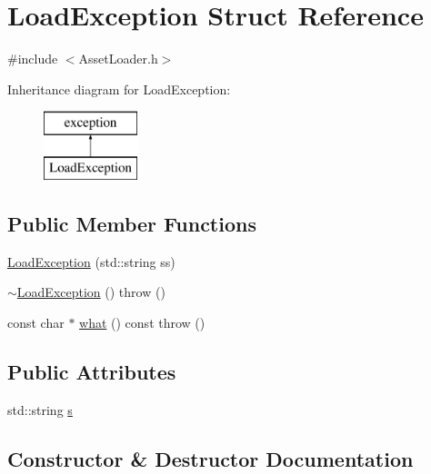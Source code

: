 \hypertarget{struct_load_exception}{}\section{Load\+Exception Struct Reference}
\label{struct_load_exception}


{\ttfamily \#include $<$Asset\+Loader.\+h$>$}

Inheritance diagram for Load\+Exception\+:\begin{figure}[H]
\begin{center}
\leavevmode
\includegraphics[height=2.000000cm]{struct_load_exception}
\end{center}
\end{figure}
\subsection*{Public Member Functions}
\begin{DoxyCompactItemize}
\item 
\hyperlink{struct_load_exception_a0dfeb76ded37d02c7765826842934f86}{Load\+Exception} (std\+::string ss)
\item 
\hyperlink{struct_load_exception_afb006cdbeb6ca9bab0c9bc3f7df9291b}{$\sim$\+Load\+Exception} ()  throw ()
\item 
const char $\ast$ \hyperlink{struct_load_exception_aa77af17720977ac8f651a4678ecf672c}{what} () const  throw ()
\end{DoxyCompactItemize}
\subsection*{Public Attributes}
\begin{DoxyCompactItemize}
\item 
std\+::string \hyperlink{struct_load_exception_ac148fff547e53eac53f36a2eb18f312a}{s}
\end{DoxyCompactItemize}


\subsection{Constructor \& Destructor Documentation}
\hypertarget{struct_load_exception_a0dfeb76ded37d02c7765826842934f86}{}\label{struct_load_exception_a0dfeb76ded37d02c7765826842934f86} 
